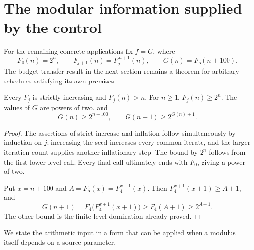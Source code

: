 \section{The modular information supplied by the control}
\label{sec:control}

For the remaining concrete applications fix $f=G$, where
\begin{equation}\label{eq:control}
 F_0(n)=2^n,\qquad F_{j+1}(n)=F_j^{\,n+1}(n),\qquad
 G(n)=F_5(n+100).
\end{equation}
The budget-transfer result in the next section remains a theorem for
arbitrary schedules satisfying its own premises.

\begin{lemma}\label{lem:growth}
Every $F_j$ is strictly increasing and $F_j(n)>n$. For $n\ge1$,
$F_j(n)\ge2^n$. The values of $G$ are powers of two, and
\begin{equation}\label{eq:growth}
 G(n)\ge2^{n+100},\qquad G(n+1)\ge2^{G(n)+1}.
\end{equation}
\end{lemma}
\begin{proof}
The assertions of strict increase and inflation follow simultaneously
by induction on $j$: increasing the seed increases every common
iterate, and the larger iteration count supplies another inflationary
step. The bound by $2^n$ follows from the first lower-level call.
Every final call ultimately ends with $F_0$, giving a power of two.

Put $x=n+100$ and $A=F_5(x)=F_4^{x+1}(x)$. Then
$F_4^{x+1}(x+1)\ge A+1$, and
\[
 G(n+1)=F_4\bigl(F_4^{x+1}(x+1)\bigr)
       \ge F_4(A+1)\ge2^{A+1}.
\]
The other bound is the finite-level domination already proved.
\end{proof}

We state the arithmetic input in a form that can be applied when a
modulus itself depends on a source parameter.

